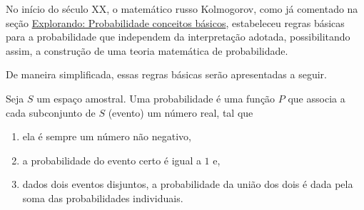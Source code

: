 
No início do século XX, o matemático russo Kolmogorov, como já comentado na seção \hyperref[conceitosbasicos]{Explorando: Probabilidade \textendash{} conceitos básicos}, estabeleceu regras básicas para a probabilidade que independem da interpretação adotada, possibilitando assim, a construção de uma teoria matemática de probabilidade.

De maneira simplificada, essas regras básicas serão apresentadas a seguir.

Seja \(S\) um espaço amostral. Uma probabilidade é uma função \(P\) que associa a cada subconjunto de \(S\) (evento)  um número real, tal que
\begin{enumerate}
\item {} 
ela é sempre um número não negativo,

\item {} 
a probabilidade do evento certo é igual a $1$ e,

\item {} 
dados dois eventos disjuntos, a probabilidade da união dos dois é dada pela soma das probabilidades individuais.

\end{enumerate}

